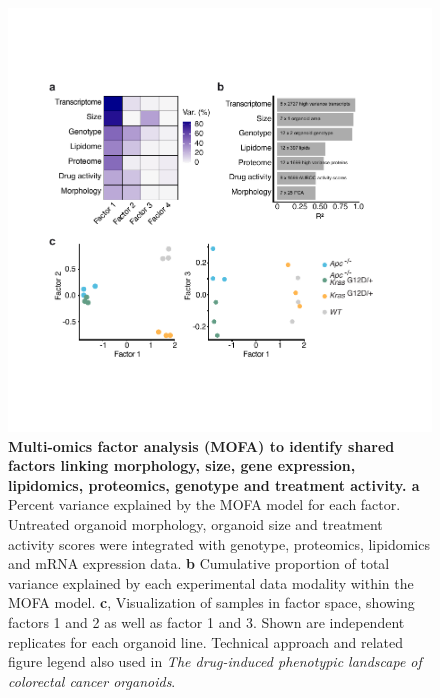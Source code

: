 \begin{flushleft}
\clearpage
\begin{figure}[h!]
\centering
\includegraphics[width=400pt,
                height=\textheight,
                keepaspectratio]{figures/adenomaprofiling/pdf/fig_1_7.pdf}
\caption[Multi-omics factor analysis (MOFA) to identify shared factors linking morphology, molecular state and treatment activity]{\textbf{Multi-omics factor analysis (MOFA) to identify shared factors linking morphology, size, gene expression, lipidomics, proteomics, genotype and treatment activity. a} Percent variance explained by the MOFA model for each factor. Untreated organoid morphology, organoid size and treatment activity scores were integrated with genotype, proteomics, lipidomics and mRNA expression data. \textbf{b} Cumulative proportion of total variance explained by each experimental data modality within the MOFA model. \textbf{c}, Visualization of samples in factor space, showing factors 1 and 2 as well as factor 1 and 3. Shown are independent replicates for each organoid line. Technical approach and related figure legend also used in \textit{The drug-induced phenotypic landscape of colorectal cancer organoids}\parencite{betgeDruginducedPhenotypicLandscape2022}.
}
\label{fig_170}
\end{figure}
\bigbreak


\end{flushleft}
